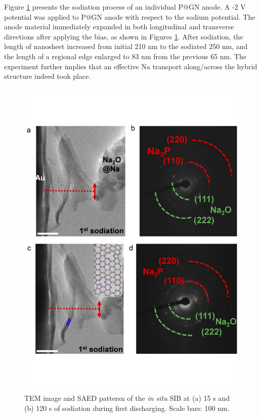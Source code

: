 Figure \ref{fig:4_3cd} presents the sodiation process of an individual P@GN anode.
A -2 V potential was applied to P@GN anode with respect to the sodium potential.
The anode material immediately expanded in both longitudinal and transverse directions after applying the bias, as shown in Figures \ref{fig:4_3cd}. 
After sodiation, the length of nanosheet increased from initial 210 nm to the sodiated 250 nm, and the length of a regional edge enlarged to 83 nm from the previous 65 nm. 
The experiment further implies that an effective Na transport along/across the hybrid structure indeed took place. 

\begin{figure}  
\centering
\includegraphics[width=320pt,angle=0]{figures/figure4_3cd}
\caption[{\it In situ} sodiation process of P@GN SIB]
{
 TEM image and SAED pattersn of the {\em in situ} SIB at (a) 15 s and (b) 120 s of sodiation during first discharging. Scale bars: 100 nm.
\label{fig:4_3cd}}
\end{figure}

